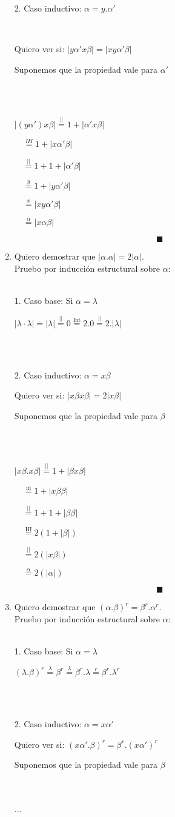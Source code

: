 \documentclass[12pt]{article}
\begin{document}
\begin{enumerate}[label=\roman*.,font=\itshape]
    \\
    \\
    \centerline{2. Caso inductivo: $\alpha = y.\alpha'$}
    \\
    \centerline{Quiero ver si: $|y\alpha' x \beta| = |x y\alpha' \beta|$}
    \centerline{Suponemos que la propiedad vale para $\alpha'$}
    \\
    \\
    \centerline{$|(y\alpha')x\beta|\overset{\text{$||$}}{=} 1 + |\alpha'x\beta|$}
    \centerline{$\quad \overset{\text{$HI$}}{=} 1 + |x\alpha'\beta|$}
    \centerline{$\quad \overset{\text{||}}{=} 1 +1+ |\alpha'\beta|$}
    \centerline{$\quad \overset{\text{$y$}}{=} 1 + |y\alpha'\beta|$}
    \centerline{$\quad \overset{\text{$x$}}{=} |xy\alpha'\beta|$}
    \centerline{$\quad \overset{\text{$\alpha$}}{=} |x\alpha\beta|$}
    \[
    \blacksquare
    \]
    \item Quiero demostrar que $|\alpha . \alpha| = 2 |\alpha|$. \\
    Pruebo por inducción estructural sobre $\alpha$:
    \\
    \\
    \centerline{1. Caso base: Si $\alpha = \lambda$}
    \centerline{$|\lambda\cdot\lambda| \overset{\text{$\cdot$}}{=} |\lambda| \overset{\text{||}}{=} 0 \overset{\text{Int}}{=}2.0 \overset{\text{||}}{=}2.|\lambda|$}
    \\
    \\
    \centerline{2. Caso inductivo: $\alpha = x\beta$}
    \centerline{Quiero ver si: $|x\beta x\beta| = 2|x\beta|$}
    \centerline{Suponemos que la propiedad vale para $\beta$}
    \\
    \\
    \centerline{$|x\beta.x\beta| \overset{\text{||}}{=} 1 + |\beta x \beta|$}
    \centerline{$\quad \overset{\text{iii}}{=} 1 + |x\beta\beta|$}
    \centerline{$\quad \overset{\text{||}}{=} 1 + 1 + |\beta\beta|$}
    \centerline{$\quad \overset{\text{HI}}{=} 2(1 +|\beta|)$}
    \centerline{$\quad \overset{\text{||}}{=} 2(|x\beta|)$}
    \centerline{$\quad \overset{\text{$\alpha$}}{=} 2(|\alpha|)$}
    \[
    \blacksquare
    \]
    \item Quiero demostrar que $(\alpha . \beta)^r = \beta^r . \alpha^r$. \\
    Pruebo por inducción estructural sobre $\alpha$:
    \\
    \\
    \centerline{1. Caso base: Si $\alpha = \lambda$}
    \centerline{$(\lambda.\beta)^r \overset{\text{$\lambda$}}{=} \beta^r\overset{\text{$\lambda$}}{=} \beta^r.\lambda \overset{\text{$r$}}{=} \beta^r.\lambda^r$}
    \\
    \\
    \centerline{2. Caso inductivo: $\alpha = x\alpha'$}
    \centerline{Quiero ver si: $(x\alpha' . \beta)^r = \beta^r . (x\alpha')^r$}
    \centerline{Suponemos que la propiedad vale para $\beta$}
    \\
    \\
    ...    
    
    
\end{enumerate}
\end{document}
